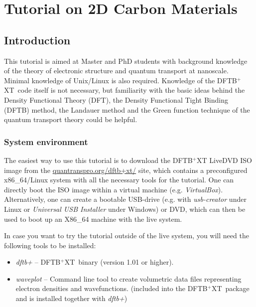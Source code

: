 \documentclass[a4paper,11pt,english]{sphinxmanual}
\newcommand{\dftbpxt}{\textsf{DFTB$^{\text{+}}$XT\ }} %
\begin{document}
{{\part{Tutorial on 2D Carbon Materials}
\label{2Dtutorial}    

\chapter{Introduction}
\label{introduction:dftb-tutorial-on-2d-carbon-materials}\label{introduction:introduction}\label{introduction::doc}
This tutorial is aimed at Master and PhD students with
background knowledge of the theory of electronic structure and quantum
transport at nanoscale. Minimal knowledge of Unix/Linux is also
required. Knowledge of the \dftbpxt code itself is not necessary, but
familiarity with the basic ideas behind the Density Functional Theory (DFT), the Density Functional Tight
Binding (DFTB) method, the Landauer method and the Green function technique of the quantum transport theory could be helpful.


\section{System environment}
\label{introduction:system-environment}
The easiest way to use this tutorial is to download the {\textsf{DFTB$^{\text{+}}$XT LiveDVD}} ISO
image from the \href{http://quantranspro.org/dftb+xt/}{quantranspro.org/dftb+xt/} site, which contains a preconfigured x86\_64/Linux system with all the
necessary tools for the tutorial. One can directly boot the ISO image
within a virtual machine (e.g. \emph{VirtualBox}). Alternatively, one can
create a bootable USB-drive (e.g. with \emph{usb-creator} under Linux or
\emph{Universal USB Installer} under Windows) or DVD, which can then be
used to boot up an X86\_64 machine with the live system.

In case you want to try the tutorial outside of the live system, you
will need the following tools to be installed:

\begin{itemize}
  
\item {} 
\emph{dftb+} -- \dftbpxt binary (version 1.01 or higher).

\item {} 
\emph{waveplot} -- Command line tool to create volumetric data files
representing electron densities and wavefunctions. (included into the \dftbpxt package and is installed together with \emph{dftb+}) 


\end{itemize}}}
\end{document}
